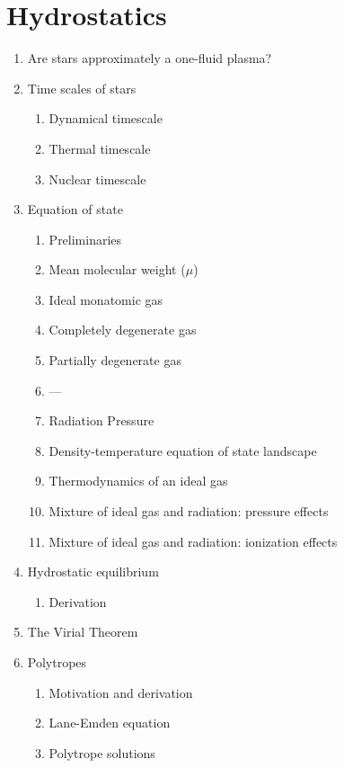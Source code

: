 \documentclass{article}
\begin{document}
\section{Hydrostatics}
\begin{enumerate}
    \item Are stars approximately a one-fluid plasma?
    \item Time scales of stars
        \begin{enumerate}
            \item Dynamical timescale
            \item Thermal timescale
            \item Nuclear timescale
        \end{enumerate}
    \item Equation of state
        \begin{enumerate}
            \item Preliminaries
            \item Mean molecular weight (${\mu}$)
            \item Ideal monatomic gas
            \item Completely degenerate gas
            \item Partially degenerate gas
            \item ---
            \item Radiation Pressure
            \item Density-temperature equation of state landscape
            \item Thermodynamics of an ideal gas
            \item Mixture of ideal gas and radiation: pressure effects
            \item Mixture of ideal gas and radiation: ionization effects
        \end{enumerate}
    \item Hydrostatic equilibrium
        \begin{enumerate}
            \item Derivation
        \end{enumerate}
    \item The Virial Theorem
    \item Polytropes
        \begin{enumerate}
            \item Motivation and derivation
            \item Lane-Emden equation
            \item Polytrope solutions
        \end{enumerate}
\end{enumerate}
\end{document}
